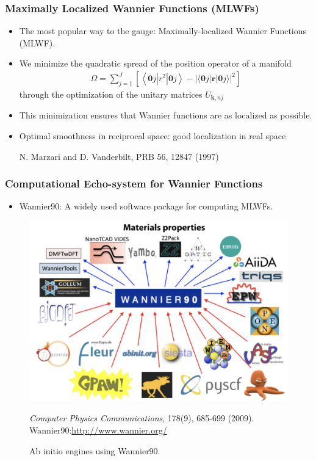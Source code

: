 \documentclass{CustomBeamer}
\begin{document}
    \begin{frame}
    \frametitle{Maximally Localized Wannier Functions (MLWFs)}
    \begin{itemize}
        \item The most popular way to the gauge: Maximally-localized Wannier Functions (MLWF).
        \item We minimize the quadratic spread of the position operator of a manifold
        \begin{align}
        \Omega=\sum_{j=1}^J\left[\left\langle\mathbf{0} j\left|r^2\right| \mathbf{0} j\right\rangle-|\langle\mathbf{0} j|\mathbf{r}| \mathbf{0} j\rangle|^2\right]
        \end{align}
        through the optimization of the unitary matrices $U_{\mathbf{k}, n j}$
        \item This minimization ensures that Wannier functions are as localized as possible.
        \item Optimal smoothness in reciprocal space: good localization in real space

        N. Marzari and D. Vanderbilt, PRB 56, 12847 (1997)
    \end{itemize}
    \end{frame}
    
    \begin{frame}
    \frametitle{Computational Echo-system for Wannier Functions}
    \begin{itemize}
        \item Wannier90: A widely used software package for computing MLWFs.
    \end{itemize}
    \begin{figure}
        \centering
        \includegraphics[width=0.5\linewidth]{wannier90.png}
        \caption{Ab initio engines using Wannier90. }
        \item \textit{Computer Physics Communications}, 178(9), 685-699 (2009). Wannier90:\url{http://www.wannier.org/}
    \end{figure}
    \end{frame}
    
\end{document}
